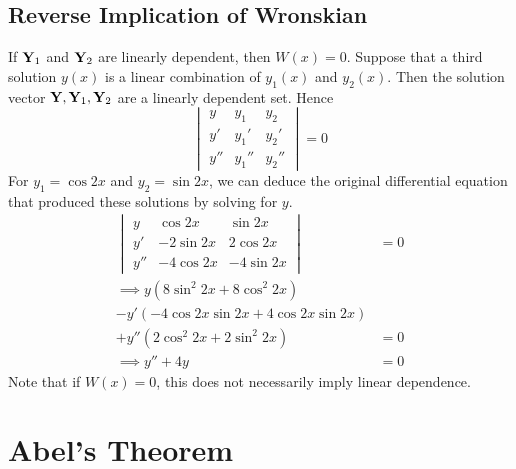 \documentclass{article}
\begin{document}
\subsection{Reverse Implication of Wronskian}
If $\vb Y_1$ and $\vb Y_2$ are linearly dependent, then $W(x) = 0$. Suppose that a third solution $y(x)$ is a linear combination of $y_1(x)$ and $y_2(x)$. Then the solution vector $\vb Y, \vb Y_1, \vb Y_2$ are a linearly dependent set. Hence
\[
	\begin{vmatrix}
		y   & y_1   & y_2   \\
		y'  & y_1'  & y_2'  \\
		y'' & y_1'' & y_2''
	\end{vmatrix}
	= 0
\]
For $y_1 = \cos 2x$ and $y_2 = \sin 2x$, we can deduce the original differential equation that produced these solutions by solving for $y$.
\begin{align*}
	\begin{vmatrix}
		y   & \cos 2x   & \sin 2x    \\
		y'  & -2\sin 2x & 2 \cos 2x  \\
		y'' & -4\cos 2x & -4 \sin 2x
	\end{vmatrix}          & = 0 \\
	\implies y(8\sin^2 2x + 8\cos^2 2x) &     \\ - y'(-4 \cos 2x \sin 2x + 4 \cos 2x \sin 2x) &\\ + y''(2\cos^2 2x + 2\sin^2 2x) &= 0 \\
	\implies y'' + 4y                   & = 0
\end{align*}
Note that if $W(x) = 0$, this does not necessarily imply linear dependence.

\section{Abel's Theorem}
\end{document}
